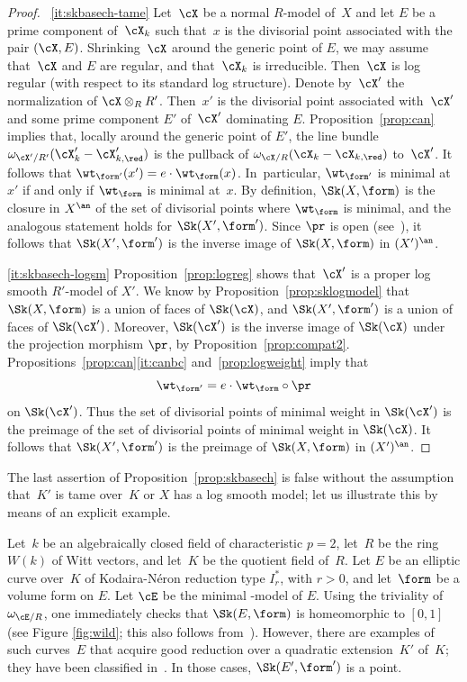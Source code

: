 \skpt
\begin{proof}
~\eqref{it:skbasech-tame} Let~$\cX$ be a normal $R$\nobreakdash-model of~$X$ and let $E$ be a prime component of~$\cX_k$ such that~$x$ is the divisorial point associated with the pair $(\cX,E)$. Shrinking~$\cX$ around the generic point of $E$, we may assume that~$\cX$ and $E$ are regular, and that~$\cX_k$ is irreducible. Then~$\cX$ is log regular (with respect to its standard log structure).
Denote by~$\cX'$ the normalization of $\cX\otimes_R R'$. Then~$x'$ is the divisorial point associated with~$\cX'$ and some prime component $E'$ of~$\cX'$ dominating $E$.
Proposition~\ref{prop:can} implies that, locally around the generic point of $E'$, the line bundle $\omega_{\cX'/R'}(\cX'_k-\cX'_{k,\red})$ is the pullback of $\omega_{\cX/R}(\cX_k-\cX_{k,\red})$ to~$\cX'$. It follows that $\wt_{\form'}(x')=e\cdot \wt_{\form}(x)$. In~particular, $\wt_{\form'}$ is minimal at~$x'$ if and only if
$\wt_{\form}$ is minimal at~$x$.
By definition, $\Sk(X,\form)$ is the closure in $X^{\an}$ of the set of divisorial points where $\wt_{\form}$ is minimal, and the analogous statement holds for
$\Sk(X',\form')$. Since $\pr$ is open (see~\cite[3.2.7]{BerkIHES}),
it follows that $\Sk(X',\form')$ is the inverse image of $\Sk(X,\form)$ in $(X')^{\an}$.

\eqref{it:skbasech-logsm}
Proposition~\ref{prop:logreg} shows that~$\cX'$ is a proper log smooth $R'$-model of $X'$. We know by Proposition~\ref{prop:sklogmodel} that $\Sk(X,\form)$ is a union of faces of $\Sk(\cX)$, and
$\Sk(X',\form')$ is a union of faces of $\Sk(\cX')$.
Moreover, $\Sk(\cX')$ is the inverse image of $\Sk(\cX)$ under the projection morphism $\pr$, by Proposition~\ref{prop:compat2}.
Propositions~\ref{prop:can}\eqref{it:canbc} and~\ref{prop:logweight} imply that
\[
\wt_{\form'}=e\cdot \wt_{\form}\circ \pr
\]
on $\Sk(\cX')$.
Thus the set of divisorial points of minimal weight in $\Sk(\cX')$ is the preimage of the set of divisorial points of minimal weight in $\Sk(\cX)$.
It follows that $\Sk(X',\form')$ is the preimage of $\Sk(X,\form)$ in $(X')^{\an}$.
\end{proof}

The last assertion of Proposition~\ref{prop:skbasech} is false without the assumption that~$K'$ is tame over~$K$ or $X$ has a log smooth model; let us illustrate this by means of an explicit example.

\begin{example}\label{exam:wild}
Let~$k$ be an algebraically closed field of characteristic $p=2$, let~$R$ be the ring $W(k)$ of Witt vectors, and let~$K$ be the quotient field of~$R$.
Let $E$ be an elliptic curve over~$K$ of Kodaira-Néron reduction type $I_{r}^{\ast}$, with $r>0$, and let~$\form$ be a volume form on $E$.
Let $\cE$ be the minimal \snc-model of $E$. Using the triviality of $\omega_{\cE/R}$, one immediately checks that $\Sk(E,\form)$ is homeomorphic to $[0,1]$ (see Figure \ref{fig:wild}; this also follows from~\cite[3.3.13]{BaNi}).
However, there are examples of such curves~$E$ that acquire good reduction over a quadratic extension~$K'$ of~$K$; they have been classified in~\cite[2.8]{lor}. In those cases, $\Sk(E',\form')$ is a point.
\end{example}

